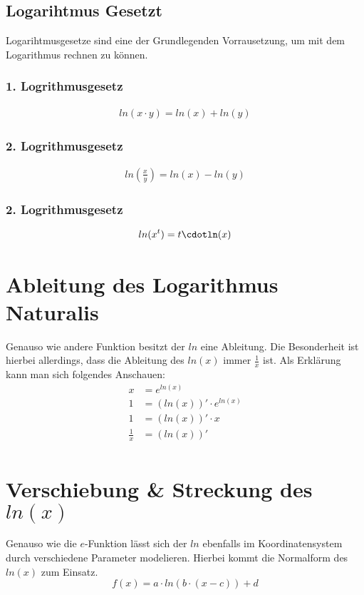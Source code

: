 \subsection{Logarihtmus Gesetzt}
Logarihtmusgesetze sind eine der Grundlegenden Vorrausetzung, um mit dem Logarithmus rechnen zu können. 
\subsubsection{1. Logrithmusgesetz}
\begin{align*}
	ln(x\cdot y)=ln(x)+ln(y)
\end{align*}
\subsubsection{2. Logrithmusgesetz}
\begin{align*}
	ln\left(\frac{x}{y}\right)=ln(x)-ln(y)
\end{align*}
\subsubsection{2. Logrithmusgesetz}
\begin{align*}
	ln(x^t)=t\cdotln(x)
\end{align*}
\pagebreak
\section{Ableitung des Logarithmus Naturalis}
Genauso wie andere Funktion besitzt der $ln$ eine Ableitung. Die Besonderheit ist hierbei allerdings, dass die Ableitung des $ln(x)$ immer $\frac{1}{x}$ ist. Als Erklärung kann man sich folgendes Anschauen:
\begin{align*}
	x&=e^{ln(x)}\tag{Ableiten auf beiden Seiten}\\
	1&=(ln(x))'\cdot e^{ln(x)}\tag{Beide Seiten vereinfachen}\\
	1&=(ln(x))'\cdot x\tag{Durch $x$ dividieren}\\
	\frac{1}{x}&=(ln(x))'\\	
\end{align*}
\pagebreak
\section{Verschiebung \& Streckung des $ln(x)$}
Genauso wie die $e$-Funktion lässt sich der $ln$ ebenfalls im Koordinatensystem durch verschiedene Parameter modelieren. Hierbei kommt die Normalform des $ln(x)$ zum Einsatz.
\[f(x)=a\cdot ln(b\cdot(x-c))+d\]
